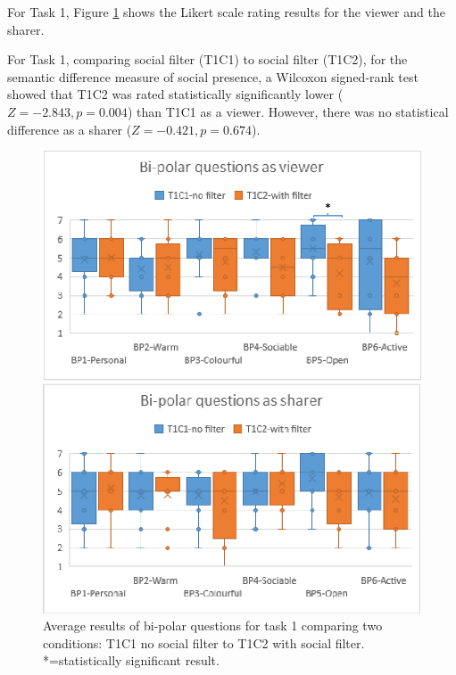 For Task 1, Figure \ref{fig:frontier18:result-bipolar-filter} shows the Likert scale rating results for the viewer and the sharer. 

For Task 1, comparing social filter (T1C1) to social filter (T1C2), for the semantic difference measure of social presence, a Wilcoxon signed-rank test showed that T1C2 was rated statistically significantly lower ($Z=-2.843, p=0.004$) than T1C1 as a viewer. However, there was no statistical difference as a sharer ($Z=-0.421, p=0.674$).

\begin{figure}[h]
    \begin{center}
    \includegraphics[width=.8\linewidth]{images/54-hiding-frontier18/images-13.eps}
    \caption{Average results of bi-polar questions for task 1 comparing two conditions: T1C1 no social filter to T1C2 with social filter. *=statistically significant result.}
    \label{fig:frontier18:result-bipolar-filter}
    \end{center}
\end{figure}

